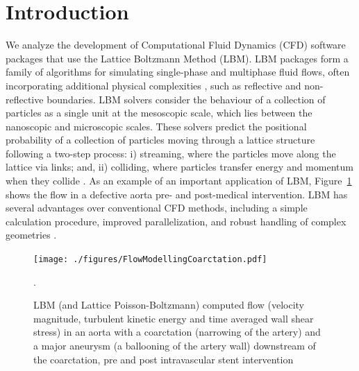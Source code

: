 \documentclass[final, 3p, times, authoryear]{elsarticle}
\begin{document}

\section{Introduction} \label{secIntro}

We analyze the development of Computational Fluid Dynamics (CFD) software
packages that use the Lattice Boltzmann Method (LBM). LBM packages form a family
of algorithms for simulating single-phase and multiphase fluid flows, often
incorporating additional physical complexities \citep{chen1998lattice}, such as
reflective and non-reflective boundaries. LBM solvers consider the behaviour of a
collection of particles as a single unit at the mesoscopic scale, which lies
between the nanoscopic and microscopic scales. These solvers predict the
positional probability of a collection of particles moving through a lattice
structure following a two-step process: i) streaming, where the particles move
along the lattice via links; and, ii) colliding, where particles transfer energy
and momentum when they collide \citep{bao2011lattice}. As an example of an
important application of LBM, Figure~\ref{Fig_coarctation} shows the flow in a
defective aorta pre- and post-medical intervention. LBM has several advantages
over conventional CFD methods, including a simple calculation procedure,
improved parallelization, and robust handling of complex geometries
\citep{ganji2015application}.

\begin{figure}[h!]
	\begin{center}
		\texttt{[image: ./figures/FlowModellingCoarctation.pdf]}
		\caption{LBM (and Lattice Poisson-Boltzmann) computed flow (velocity
		magnitude, turbulent kinetic energy and time averaged wall shear stress)
		in an aorta with a coarctation (narrowing of the artery) and a major
		aneurysm (a ballooning of the artery wall) downstream of the
		coarctation, pre and post intravascular stent intervention
		\citep{SadeghiEtAl2020}}.
		\label{Fig_coarctation}
	\end{center}
\end{figure}
\end{document}

